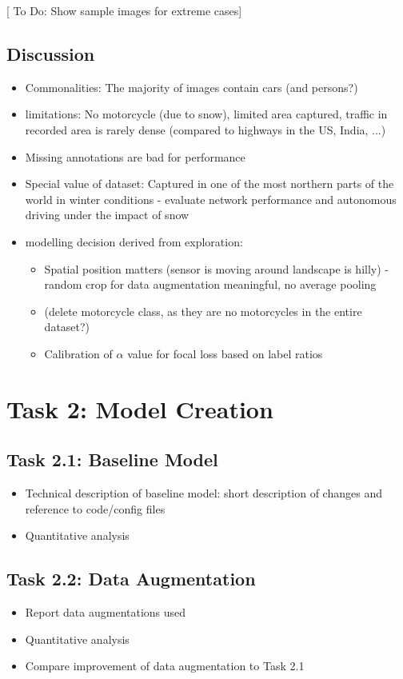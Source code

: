 \documentclass{article}
\newcommand{\todo}[1]{{\sf[{\footnotesize{{\color{blue} To Do: #1}}]}}}
\begin{document}
\todo{Show sample images for extreme cases}

\subsection*{Discussion}
\begin{itemize}
    \item Commonalities: The majority of images contain cars (and persons?)
    \item limitations: No motorcycle (due to snow), limited area captured, traffic in recorded area is rarely dense (compared to highways in the US, India, ...)
    \item Missing annotations are bad for performance
    \item Special value of dataset: Captured in one of the most northern parts of the world in winter conditions - evaluate network performance and autonomous driving under the impact of snow
    \item modelling decision derived from exploration:
        \begin{itemize}
            \item Spatial position matters (sensor is moving around landscape is hilly) - random crop for data augmentation meaningful, no average pooling
            \item (delete motorcycle class, as they are no motorcycles in the entire dataset?)
            \item Calibration of $\alpha$ value for focal loss based on label ratios
        \end{itemize}
\end{itemize}

\section*{Task 2: Model Creation}

\subsection*{Task 2.1: Baseline Model}
\begin{itemize}
    \item Technical description of baseline model: short description of changes and reference to code/config files
    \item Quantitative analysis
\end{itemize}

\subsection*{Task 2.2: Data Augmentation}
\begin{itemize}
    \item Report data augmentations used
    \item Quantitative analysis
    \item Compare improvement of data augmentation to Task 2.1
\end{itemize}
\end{document}
